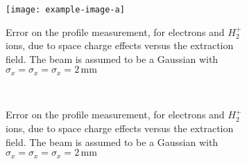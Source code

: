 \begin{figure}[!ht]
	\begin{subfigure}[t]{0.5\textwidth}
		\texttt{[image: example-image-a]}
		\caption{Error on the profile measurement, for electrons and $H_{2}^{+}$ ions, due to space charge effects versus the extraction field. The beam is assumed to be a Gaussian with $\sigma_{x}=\sigma_{x}=\sigma_{x}=2\,\mathrm{mm}$}
		\label{}
	\end{subfigure}
	~
	\begin{subfigure}[t]{0.5\textwidth}
		
		\caption{Error on the profile measurement, for electrons and $H_{2}^{+}$ ions, due to space charge effects versus the extraction field. The beam is assumed to be a Gaussian with $\sigma_{x}=\sigma_{x}=\sigma_{x}=2\,\mathrm{mm}$}
		\label{}
	\end{subfigure}
	\caption[]{}
	\label{chap:}
\end{figure}
